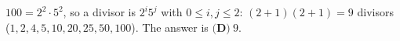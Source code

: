 $100=2^2\cdot5^2$, so a divisor is $2^i5^j$ with $0\le i,j\le2$: $(2+1)(2+1)=9$ divisors ($1,2,4,5,10,20,25,50,100$). The answer is $\boxed{\textbf{(D)}\ 9}$.
